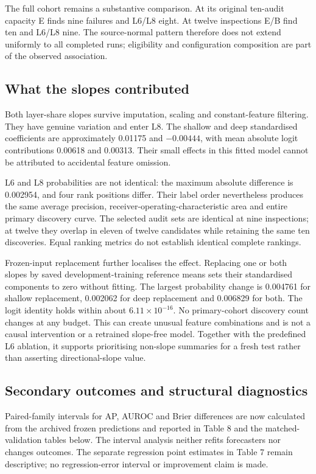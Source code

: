 The full cohort remains a substantive comparison. At its original ten-audit capacity E finds nine failures and L6/L8 eight. At twelve inspections E/B find ten and L6/L8 nine. The source-normal pattern therefore does not extend uniformly to all completed runs; eligibility and configuration composition are part of the observed association.

\subsection{What the slopes contributed}
Both layer-share slopes survive imputation, scaling and constant-feature filtering. They have genuine variation and enter L8. The shallow and deep standardised coefficients are approximately 0.01175 and $-0.00444$, with mean absolute logit contributions 0.00618 and 0.00313. Their small effects in this fitted model cannot be attributed to accidental feature omission.

L6 and L8 probabilities are not identical: the maximum absolute difference is 0.002954, and four rank positions differ. Their label order nevertheless produces the same average precision, receiver-operating-characteristic area and entire primary discovery curve. The selected audit sets are identical at nine inspections; at twelve they overlap in eleven of twelve candidates while retaining the same ten discoveries. Equal ranking metrics do not establish identical complete rankings.

Frozen-input replacement further localises the effect. Replacing one or both slopes by saved development-training reference means sets their standardised components to zero without fitting. The largest probability change is 0.004761 for shallow replacement, 0.002062 for deep replacement and 0.006829 for both. The logit identity holds within about $6.11\times10^{-16}$. No primary-cohort discovery count changes at any budget. This can create unusual feature combinations and is not a causal intervention or a retrained slope-free model. Together with the predefined L6 ablation, it supports prioritising non-slope summaries for a fresh test rather than asserting directional-slope value.

\subsection{Secondary outcomes and structural diagnostics}
Paired-family intervals for AP, AUROC and Brier differences are now calculated from the archived frozen predictions and reported in Table 8 and the matched-validation tables below. The interval analysis neither refits forecasters nor changes outcomes. The separate regression point estimates in Table 7 remain descriptive; no regression-error interval or improvement claim is made.

